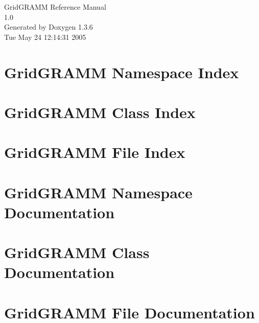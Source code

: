 \documentclass[a4paper]{book}
\begin{document}
\begin{titlepage}
\vspace*{7cm}
\begin{center}
{\Large Grid\-GRAMM Reference Manual\\[1ex]\large 1.0 }\\
\vspace*{1cm}
{\large Generated by Doxygen 1.3.6}\\
\vspace*{0.5cm}
{\small Tue May 24 12:14:31 2005}\\
\end{center}
\end{titlepage}
\clearemptydoublepage
{}
\tableofcontents
\clearemptydoublepage
{}
\chapter{Grid\-GRAMM Namespace Index}

\chapter{Grid\-GRAMM Class Index}

\chapter{Grid\-GRAMM File Index}

\chapter{Grid\-GRAMM Namespace Documentation}

\chapter{Grid\-GRAMM Class Documentation}


\chapter{Grid\-GRAMM File Documentation}









\printindex
\end{document}
